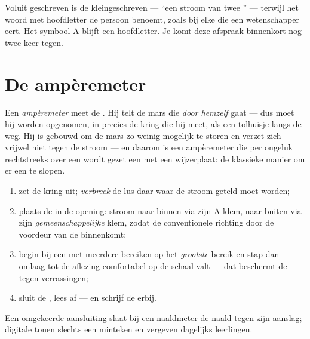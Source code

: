 \begin{remark}\label{rem:g8:intensity-ammeter:person}
Voluit geschreven is de  kleingeschreven --- ``een stroom
van twee '' --- terwijl het woord met hoofdletter de
persoon benoemt, zoals bij elke  die een wetenschapper
eert. Het symbool \unit{A} blijft een hoofdletter. Je komt deze
afspraak binnenkort nog twee keer tegen.
\end{remark}

\section{De ampèremeter}

\begin{definition}[Ampèremeter]\label{def:g8:intensity-ammeter:ammeter}
Een \emph{ampèremeter} meet de
. Hij telt de mars die \emph{door hemzelf} gaat ---
dus moet hij \emph{} worden opgenomen, in precies de kring
die hij meet, als een tolhuisje langs de weg. Hij is gebouwd om
de mars zo weinig mogelijk te storen en verzet zich vrijwel niet tegen
de stroom --- en daarom is een ampèremeter die per ongeluk rechtstreeks
over een  wordt gezet een  met een
wijzerplaat: de klassieke manier om er een te slopen.
\end{definition}

\begin{method}\label{met:g8:intensity-ammeter:measure}
\begin{enumerate}
  \item zet de kring uit; \emph{verbreek} de lus daar waar de stroom
        geteld moet worden;
  \item plaats de  in de opening: stroom naar binnen
        via zijn \unit{A}-klem, naar buiten via zijn
        \emph{gemeenschappelijke} klem, zodat de conventionele
        richting door de voordeur van de  binnenkomt;
  \item begin bij een  met meerdere bereiken op het
        \emph{grootste} bereik en stap dan omlaag tot de aflezing
        comfortabel op de schaal valt --- dat beschermt de  tegen
        verrassingen;
  \item sluit de , lees af --- en schrijf de
         erbij.
\end{enumerate}
Een omgekeerde aansluiting slaat bij een naaldmeter de naald tegen zijn
aanslag; digitale  tonen slechts een minteken en vergeven
dagelijks leerlingen.
\end{method}

